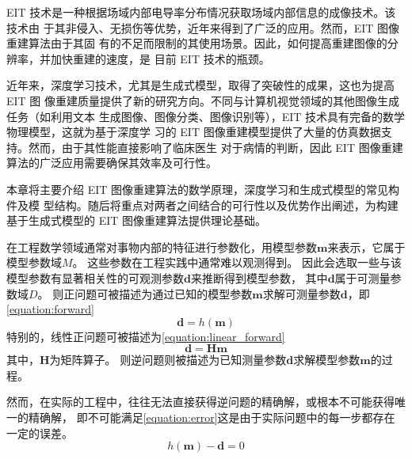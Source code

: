 

EIT 技术是一种根据场域内部电导率分布情况获取场域内部信息的成像技术。该技术由
于其非侵入、无损伤等优势，近年来得到了广泛的应用。然而，EIT 图像重建算法由于其固
有的不足而限制的其使用场景。因此，如何提高重建图像的分辨率，并加快重建的速度，是
目前 EIT 技术的瓶颈。

近年来，深度学习技术，尤其是生成式模型，取得了突破性的成果，这也为提高 EIT 图
像重建质量提供了新的研究方向。不同与计算机视觉领域的其他图像生成任务（如利用文本
生成图像、图像分类、图像识别等），EIT 技术具有完备的数学物理模型，这就为基于深度学
习的 EIT 图像重建模型提供了大量的仿真数据支持。然而，由于其性能直接影响了临床医生
对于病情的判断，因此 EIT 图像重建算法的广泛应用需要确保其效率及可行性。

本章将主要介绍 EIT 图像重建算法的数学原理，深度学习和生成式模型的常见构件及模
型结构。随后将重点对两者之间结合的可行性以及优势作出阐述，为构建基于生成式模型的
EIT 图像重建算法提供理论基础。

\label{PrincipleEIT}
在工程数学领域通常对事物内部的特征进行参数化，用模型参数$\boldsymbol{m}$来表示，它属于模型参数域$M$。
这些参数在工程实践中通常难以观测得到。
因此会选取一些与该模型参数有显著相关性的可观测参数$\boldsymbol{d}$来推断得到模型参数，
其中$\boldsymbol{d}$属于可测量参数域$D$。
则正问题可被描述为通过已知的模型参数$\boldsymbol{m}$求解可测量参数$\boldsymbol{d}$，即\cref{equation:forward}
\begin{equation}
  \label{equation:forward}
  \boldsymbol{d} = h(\boldsymbol{m})
\end{equation}
特别的，线性正问题可被描述为\cref{equation:linear_forward}
\begin{equation}
  \label{equation:linear_forward}
  \boldsymbol{d} = \boldsymbol{H}\boldsymbol{m}
\end{equation}
其中，$\boldsymbol{H}$为矩阵算子。
则逆问题则被描述为已知测量参数$\boldsymbol{d}$求解模型参数$\boldsymbol{m}$的过程。

然而，在实际的工程中，往往无法直接获得逆问题的精确解，或根本不可能获得唯一的精确解，
即不可能满足\cref{equation:error}这是由于实际问题中的每一步都存在一定的误差。
\begin{equation}
  \label{equation:error}
  h(\boldsymbol{m}) - \boldsymbol{d} = 0
\end{equation}

